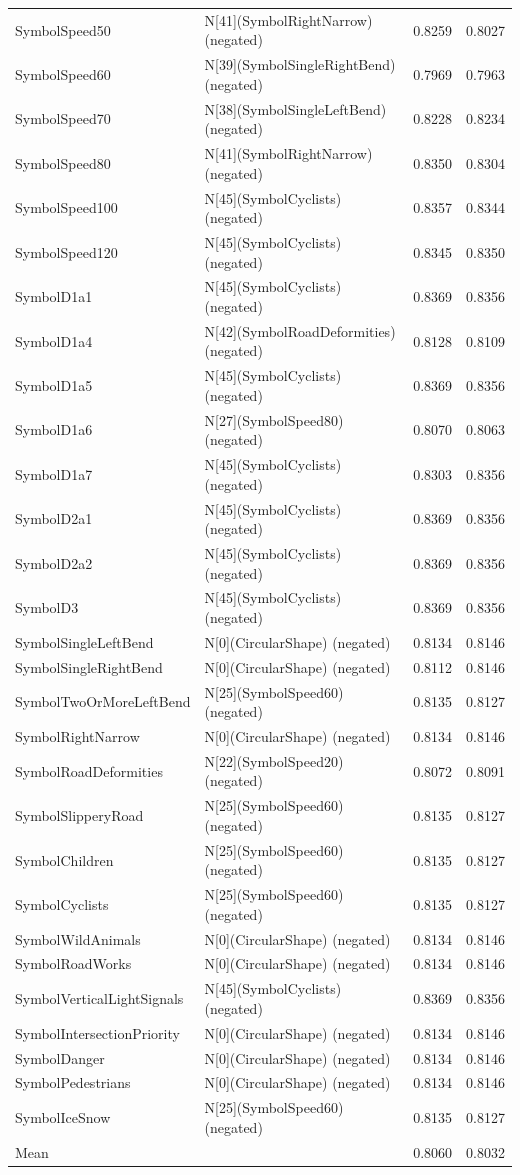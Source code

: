 \begin{tabular}{llll}
SymbolSpeed50 & N[41](SymbolRightNarrow) (negated) & 0.8259 & 0.8027 \\
SymbolSpeed60 & N[39](SymbolSingleRightBend) (negated) & 0.7969 & 0.7963 \\
SymbolSpeed70 & N[38](SymbolSingleLeftBend) (negated) & 0.8228 & 0.8234 \\
SymbolSpeed80 & N[41](SymbolRightNarrow) (negated) & 0.8350 & 0.8304 \\
SymbolSpeed100 & N[45](SymbolCyclists) (negated) & 0.8357 & 0.8344 \\
SymbolSpeed120 & N[45](SymbolCyclists) (negated) & 0.8345 & 0.8350 \\
SymbolD1a1 & N[45](SymbolCyclists) (negated) & 0.8369 & 0.8356 \\
SymbolD1a4 & N[42](SymbolRoadDeformities) (negated) & 0.8128 & 0.8109 \\
SymbolD1a5 & N[45](SymbolCyclists) (negated) & 0.8369 & 0.8356 \\
SymbolD1a6 & N[27](SymbolSpeed80) (negated) & 0.8070 & 0.8063 \\
SymbolD1a7 & N[45](SymbolCyclists) (negated) & 0.8303 & 0.8356 \\
SymbolD2a1 & N[45](SymbolCyclists) (negated) & 0.8369 & 0.8356 \\
SymbolD2a2 & N[45](SymbolCyclists) (negated) & 0.8369 & 0.8356 \\
SymbolD3 & N[45](SymbolCyclists) (negated) & 0.8369 & 0.8356 \\
SymbolSingleLeftBend & N[0](CircularShape) (negated) & 0.8134 & 0.8146 \\
SymbolSingleRightBend & N[0](CircularShape) (negated) & 0.8112 & 0.8146 \\
SymbolTwoOrMoreLeftBend & N[25](SymbolSpeed60) (negated) & 0.8135 & 0.8127 \\
SymbolRightNarrow & N[0](CircularShape) (negated) & 0.8134 & 0.8146 \\
SymbolRoadDeformities & N[22](SymbolSpeed20) (negated) & 0.8072 & 0.8091 \\
SymbolSlipperyRoad & N[25](SymbolSpeed60) (negated) & 0.8135 & 0.8127 \\
SymbolChildren & N[25](SymbolSpeed60) (negated) & 0.8135 & 0.8127 \\
SymbolCyclists & N[25](SymbolSpeed60) (negated) & 0.8135 & 0.8127 \\
SymbolWildAnimals & N[0](CircularShape) (negated) & 0.8134 & 0.8146 \\
SymbolRoadWorks & N[0](CircularShape) (negated) & 0.8134 & 0.8146 \\
SymbolVerticalLightSignals & N[45](SymbolCyclists) (negated) & 0.8369 & 0.8356 \\
SymbolIntersectionPriority & N[0](CircularShape) (negated) & 0.8134 & 0.8146 \\
SymbolDanger & N[0](CircularShape) (negated) & 0.8134 & 0.8146 \\
SymbolPedestrians & N[0](CircularShape) (negated) & 0.8134 & 0.8146 \\
SymbolIceSnow & N[25](SymbolSpeed60) (negated) & 0.8135 & 0.8127 \\
Mean &  & 0.8060 & 0.8032 \\
\bottomrule
\end{tabular}
